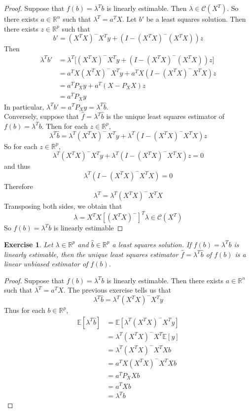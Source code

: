 \documentclass[12pt]{amsart}
\newtheorem{ex}[thm]{Exercise}
\newcommand{\lam}{\lambda}
\newcommand{\E}{\mathbb{E}}
\newcommand{\R}{\mathbb{R}}
\newcommand{\MC}{\mathcal{C}}
\begin{document}
\begin{proof} Suppose that $f(b) = \lam^T b$ is linearly estimable. Then $\lam \in \MC(X^T)$. So there exists $a \in \R^n$ such that $\lam^T = a^TX$. Let $b'$ be a least squares solution. Then there exists $z \in \R^p$ such that $$b' = (X^TX)^-X^Ty + (I-(X^TX)^-(X^TX))z$$ Then 
\begin{align*}
\lam^Tb' 
&= \lam^T\bigg[ (X^TX)^-X^Ty + (I-(X^TX)^-(X^TX))z \bigg] \\
&= a^TX(X^TX)^-X^Ty + a^TX(I-(X^TX)^-X^TX)z \\
&= a^TP_Xy + a^T(X-P_XX)z \\
&= a^TP_Xy
\end{align*} 
In particular, $\lam^Tb' = a^TP_Xy = \lam^T\hat{b}$. \vspace{2mm}\\ Conversely, suppose that $\hat{f} = \lambda^T \hat{b}$ is the unique least squares estimator of $f(b) = \lam^T b$. Then for each $z \in \R^p$, $$\lam^T\hat{b} 
= \lam^T(X^TX)^-X^Ty + \lam^T(I-(X^TX)^-X^TX)z$$
So for each $z \in \R^p$, $$\lam^T(X^TX)^-X^Ty + \lam^T(I-(X^TX)^-X^TX)z = 0$$ and thus $$\lam^T(I-(X^TX)^-X^TX) = 0$$ Therefore $$ \lam^T = \lam^T(X^TX)^-X^TX$$ Transposing both sides, we obtain that $$\lam = X^TX[(X^TX)^-]^T\lam \in \MC(X^T)$$ So $f(b) = \lam^T b$ is linearly estimable
\end{proof}

\begin{ex}
Let $\lam \in \R^p$ and $\hat{b} \in \R^p$ a least squares solution. If $f(b) = \lam^Tb$ is linearly estimable, then the unique least squares estimator $\hat{f} = \lam^T\hat{b}$ of $f(b)$ is a linear unbiased estimator of $f(b)$.
\end{ex}

\begin{proof}
Suppose that $f(b) = \lam^Tb$ is linearly estimable. Then there exists $a \in \R^n$ such that $\lam^T = a^TX$. The previous exercise tells us that $$\lam^T\hat{b} = \lam^T(X^TX)^-X^Ty$$ Thus for each $b \in \R^p$,
\begin{align*}
\E[\lam^T\hat{b}] 
&= \E[\lam^T(X^TX)^-X^Ty] \\
&= \lam^T(X^TX)^-X^T\E[y] \\
&= \lam^T(X^TX)^-X^TXb \\ 
&= a^TX(X^TX)^-X^TXb \\
&= a^TP_XXb \\
&= a^TXb \\
&= \lam^T b
\end{align*}
\end{proof}
\end{document}
